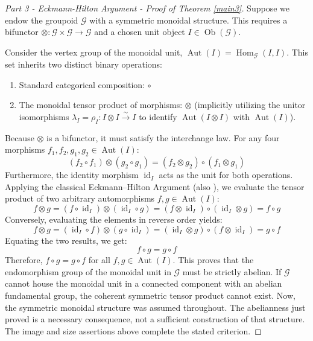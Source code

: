 \documentclass{amsart}
\begin{document}
\begin{proof}[Part 3 -  Eckmann-Hilton Argument - Proof of Theorem \ref{main3}]
Suppose we endow the groupoid $\mathcal{G}$ with a symmetric monoidal structure. This requires a bifunctor $\otimes: \mathcal{G} \times \mathcal{G} \to \mathcal{G}$ and a chosen unit object $I \in \operatorname{Ob}(\mathcal{G})$. 

Consider the vertex group of the monoidal unit, $\operatorname{Aut}(I) = \operatorname{Hom}_{\mathcal{G}}(I, I)$. This set inherits two distinct binary operations:
\begin{enumerate}
    \item Standard categorical composition: $\circ$
    \item The monoidal tensor product of morphisms: $\otimes$ (implicitly utilizing the unitor isomorphisms $\lambda_I = \rho_I: I \otimes I \xrightarrow{\sim} I$ to identify $\operatorname{Aut}(I \otimes I)$ with $\operatorname{Aut}(I)$).
\end{enumerate}
Because $\otimes$ is a bifunctor, it must satisfy the interchange law. For any four morphisms $f_1, f_2, g_1, g_2 \in \operatorname{Aut}(I)$:
\[    (f_2 \circ f_1) \otimes (g_2 \circ g_1) = (f_2 \otimes g_2) \circ (f_1 \otimes g_1)\]
Furthermore, the identity morphism $\operatorname{id}_I$ acts as the unit for both operations. Applying the classical Eckmann--Hilton Argument \cite[Theorem~1.3.1]{ronbrown2} (also \cite[Section~II.5, Exercise~5, p.~45]{maclane1998categories}), we evaluate the tensor product of two arbitrary automorphisms $f, g \in \operatorname{Aut}(I)$:
\[
    f \otimes g = (f \circ \operatorname{id}_I) \otimes (\operatorname{id}_I \circ g) \nonumber 
                = (f \otimes \operatorname{id}_I) \circ (\operatorname{id}_I \otimes g)  
                = f \circ g\]
Conversely, evaluating the elements in reverse order yields:
\[    f \otimes g = (\operatorname{id}_I \circ f) \otimes (g \circ \operatorname{id}_I) \nonumber 
                = (\operatorname{id}_I \otimes g) \circ (f \otimes \operatorname{id}_I) 
                = g \circ f\]
Equating the two results, we get:
\[    f \circ g = g \circ f\]
Therefore, $f \circ g = g \circ f$ for all $f, g \in \operatorname{Aut}(I)$. This proves that the endomorphism group of the monoidal unit in $\mathcal{G}$ must be strictly abelian. If $\mathcal{G}$ cannot house the monoidal unit in a connected component with an abelian fundamental group, the coherent symmetric tensor product cannot exist. Now, the symmetric monoidal structure was assumed throughout. The abelianness just proved is a necessary consequence, not a sufficient construction of that structure. The image and size assertions above complete the stated criterion.
\end{proof}
\end{document}

